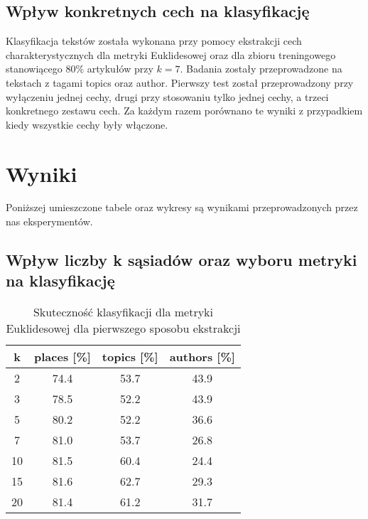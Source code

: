 \documentclass{classrep}
\begin{document}
\subsection{Wpływ konkretnych cech na klasyfikację}
Klasyfikacja tekstów została wykonana przy pomocy ekstrakcji cech charakterystycznych dla metryki Euklidesowej oraz dla zbioru treningowego stanowiącego 80\% artykułów przy $k = 7$. Badania zostały przeprowadzone na tekstach z tagami topics oraz author. Pierwszy test został przeprowadzony przy wyłączeniu jednej cechy, drugi przy stosowaniu tylko jednej cechy, a trzeci konkretnego zestawu cech. Za każdym razem porównano te wyniki z przypadkiem kiedy wszystkie cechy były włączone.

\section{Wyniki}

Poniższej umieszczone tabele oraz wykresy są wynikami przeprowadzonych przez nas eksperymentów.

\subsection{Wpływ liczby k sąsiadów oraz wyboru metryki na klasyfikację}

\begin{table}[H]
	\centering
	\begin{tabular}{c c c c} 
		\hline
		\textbf{k} & \textbf{places [\%]} & \textbf{topics [\%]} &  \textbf{authors [\%]} \\ [0.5ex] 
		\hline
		\hline 
		2 & 74.4 & 53.7 & 43.9 \\ 
		3 & 78.5 & 52.2 & 43.9 \\
		5 & 80.2 & 52.2 & 36.6 \\
		7 & 81.0 & 53.7 & 26.8 \\
		10 & 81.5 & 60.4 & 24.4 \\
		15 & 81.6 & 62.7 & 29.3 \\
		20 & 81.4 & 61.2 & 31.7 \\ 
		\hline
	\end{tabular}
	\caption{Skuteczność klasyfikacji dla metryki Euklidesowej dla pierwszego sposobu ekstrakcji}
\end{table}
\end{document}
